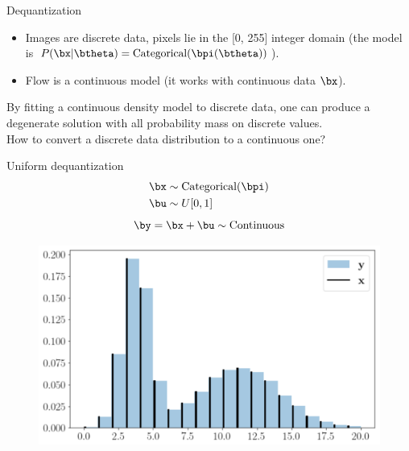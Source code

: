 

\begin{frame}
\titlepage
\end{frame}
\begin{frame}{Dequantization}
	\begin{itemize}
		\item Images are discrete data, pixels lie in the [0, 255] integer domain (the model is $P(\bx | \btheta) = \text{Categorical}(\bpi(\btheta))$).
		\item Flow is a continuous model (it works with continuous data $\bx$).
	\end{itemize}
	By fitting a continuous density model to discrete data, one can produce a degenerate solution with all probability mass on discrete values. \\
	How to convert a discrete data distribution to a continuous one?
	
	\begin{minipage}[t]{0.5\columnwidth}
		\begin{block}{Uniform dequantization}
		\vspace{-0.5cm}
			\begin{align*}
				\bx &\sim \text{Categorical}(\bpi) \\
				 \bu &\sim U[0, 1]
			\end{align*}
			\[
			\by = \bx + \bu \sim \text{Continuous} 
			\]
		\end{block}
	\end{minipage}%
	\begin{minipage}[t]{0.5\columnwidth}
		\begin{figure}
			\centering
			\includegraphics[width=1.0\linewidth]{figs/uniform_dequantization.png}
		\end{figure}
	\end{minipage}
\end{frame}
